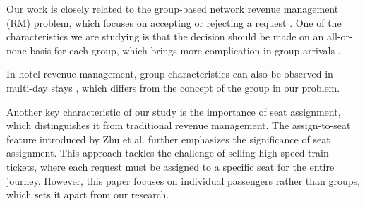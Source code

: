 
Our work is closely related to the group-based network revenue management (RM) problem, which focuses on accepting or rejecting a request \cite{gallego1997multiproduct}. One of the characteristics we are studying is that the decision should be made on an all-or-none basis for each group, which brings more complication in group arrivals \cite{talluri2006theory}. 

In hotel revenue management, group characteristics can also be observed in multi-day stays \cite{aydin2018decomposition, bitran1995application}, which differs from the concept of the group in our problem.

Another key characteristic of our study is the importance of seat assignment, which distinguishes it from traditional revenue management. The assign-to-seat feature introduced by Zhu et al. \cite{zhu2023assign} further emphasizes the significance of seat assignment. This approach tackles the challenge of selling high-speed train tickets, where each request must be assigned to a specific seat for the entire journey. However, this paper focuses on individual passengers rather than groups, which sets it apart from our research.









